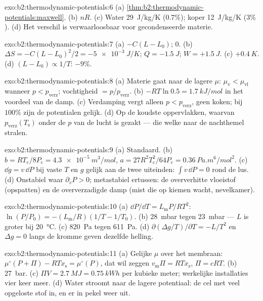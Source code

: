 \begin{solution}{exo:b2:thermodynamic-potentials:6}
(a) \cref{thm:b2:thermodynamic-potentials:maxwell}. (b) $nR$. (c) Water
\qty{29}{J/kg/K} ($0.7\%$); koper \qty{12}{J/kg/K} ($3\%$). (d) Het
verschil is verwaarloosbaar voor gecondenseerde materie.
\end{solution}

\begin{solution}{exo:b2:thermodynamic-potentials:7}
(a) $-C(L - L_0)$; $0$. (b) $\Delta S = -C(L - L_0)^2/2 = \qty{-5e-3}{J/K}$;
$Q =
\qty{-1.5}{J}$; $W = +\qty{1.5}{J}$. (c) $+\qty{0.4}{K}$. (d)
$(L - L_0) \propto
1/T$: $-9\%$.
\end{solution}

\begin{solution}{exo:b2:thermodynamic-potentials:8}
(a) Materie gaat naar de lagere $\mu$: $\mu_{\text{v}} < \mu_{\text{vl}}$
wanneer $p <
p_{\text{verz}}$; vochtigheid $= p/p_{\text{verz}}$. (b)
$-RT\ln 0.5 = \qty{1.7}{kJ/mol}$
in het voordeel van de damp. (c) Verdamping vergt alleen $p < p_{\text{verz}}$,
geen koken; bij $100\%$ zijn de potentialen gelijk. (d) Op de koudste
oppervlakken, waarvan $p_{\text{verz}}(T_{\text{s}})$ onder de $p$ van de
lucht is gezakt
--- die welke naar de nachthemel stralen.
\end{solution}

\begin{solution}{exo:b2:thermodynamic-potentials:9}
(a) Standaard. (b)
$b = RT_{\text{c}}/8P_{\text{c}} = \qty{4.3e-5}{m^3/mol}$,
$a =
27R^2T_{\text{c}}^2/64P_{\text{c}} = \qty{0.36}{Pa.m^6/mol^2}$. (c)
$\dd g = v\,\dd P$
bij vaste $T$ en $g$ gelijk aan de twee uiteinden: $\int v\,\dd P = 0$ rond de
lus. (d) Onstabiel waar $\partial_vP > 0$; metastabiel ertussen: de
oververhitte vloeistof (opspatten) en de oververzadigde damp (mist die
op kiemen wacht, nevelkamer).
\end{solution}

\begin{solution}{exo:b2:thermodynamic-potentials:10}
(a) $\dd P/\dd T = L_{\text{m}}P/RT^2$:
$\ln(P/P_0) = -(L_{\text{m}}/R)(1/T - 1/T_0)$.
(b) \qty{28}{mbar} tegen \qty{23}{mbar} --- $L$ is groter bij \qty{20}{\celsius}.
(c) \qty{820}{Pa} tegen \qty{611}{Pa}. (d)
$\partial(\Delta g/T)/\partial T = -L/T^2$
en $\Delta g = 0$ langs de kromme geven dezelfde helling.
\end{solution}

\begin{solution}{exo:b2:thermodynamic-potentials:11}
(a) Gelijke $\mu$ over het membraan:
$\mu^\circ(P + \Pi) - RTx_{\text{s}} =
\mu^\circ(P)$, dat wil zeggen
$v_{\text{m}}\Pi = RTx_{\text{s}}$, $\Pi = cRT$. (b) \qty{27}{bar}.
(c) $\Pi V = \qty{2.7}{MJ} = \qty{0.75}{kWh}$ per kubieke meter; werkelijke
installaties
vier keer meer. (d) Water stroomt naar de lagere potentiaal: de
cel met veel opgeloste stof in, en er in pekel weer uit.
\end{solution}

